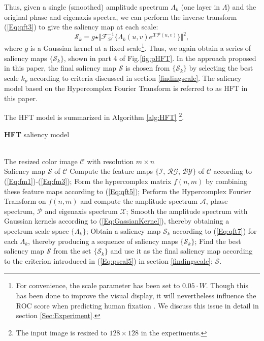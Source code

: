 \documentclass[10pt,journal,cspaper,compsoc]{IEEEtran}
\begin{document}
Thus, given a single (smoothed) amplitude spectrum $\Lambda_{k}$ (one layer in $\Lambda$) and the original phase and eigenaxis spectra, we can perform the inverse transform (\ref{Eq:qft3}) to give the saliency map at each scale:
\begin{equation}
{\mathcal{S}_{k}}=g\star\Vert\mathcal{F}_{\mathcal{H}}^{-1}\{\Lambda_{k}(u,v)e^{\mathcal{X} \mathcal{P} (u,v)}\}\Vert^{2},
\label{Eq:qft7}
\end{equation}
where $g$ is a Gaussian kernel at a fixed scale\footnote{For convenience, the scale parameter has been set to $0.05\cdot W$. Though this has been done to improve the visual display, it will nevertheless influence the ROC score when predicting human fixation \cite{ImageSignature2012}. We discuss this issue in detail in section \ref{Sec:Experiment}.}. Thus, we again obtain a series of saliency maps $\{\mathcal{S}_{k}\}$, shown in part 4 of Fig.\ref{fig:pHFT}. In the  approach proposed in this paper, the final saliency map $\mathcal{S}$ is chosen from $\{\mathcal{S}_{k}\}$ by selecting the best scale $k_{p}$ according to criteria discussed in section \ref{findingscale}. The saliency model based on the  Hypercomplex Fourier Transform is referred to as HFT in this paper.

The HFT model is  summarized in Algorithm \ref{alg:HFT} \footnote{The input image is resized to $128 \times 128$ in the experiments.}.
\begin{algorithm}[htb]         \caption{{\bf HFT }saliency model}             \label{alg:HFT}                  \begin{algorithmic}[1]                \REQUIRE ~~\\                          The resized color image ${\mathcal{C}}$ with resolution $m\times n$
\ENSURE ~~\\                           Saliency map ${\mathcal{S}}$ of ${\mathcal{C}}$
\vspace{0.15cm}
\STATE Compute the feature maps $\{\mathcal{I}$, $\mathcal{RG}$, $\mathcal{BY}\}$ of ${\mathcal{C}}$ according to (\ref{Eq:fm1})-(\ref{Eq:fm3});
\STATE Form the hypercomplex matrix $f(n,m)$ by combining these feature maps according to (\ref{Eq:qft5});
\STATE Perform the Hypercomplex Fourier Transform on $f(n,m)$ and compute the amplitude spectrum $\mathcal{A}$, phase spectrum, $\mathcal{P}$ and eigenaxis spectrum $\mathcal{X}$;
\STATE Smooth the amplitude spectrum with Gaussian kernels according to (\ref{Eq:GassianKernel}), thereby obtaining a spectrum scale space  $\{\Lambda_{k}\}$;
\STATE Obtain a saliency map ${\mathcal{S}}_{k}$ according to (\ref{Eq:qft7}) for each $\Lambda_{k}$, thereby producing a sequence of saliency maps $\{{\mathcal{S}}_{k}\}$;
\STATE Find the best saliency map ${\mathcal{S}}$ from the set $\{{\mathcal{S}}_{k}\}$ and use it as the final saliency map  according to the criterion introduced in (\ref{Eq:pscal5}) in section \ref{findingscale};
\RETURN ${\mathcal{S}}$.                \end{algorithmic}
\end{algorithm}
\end{document}
